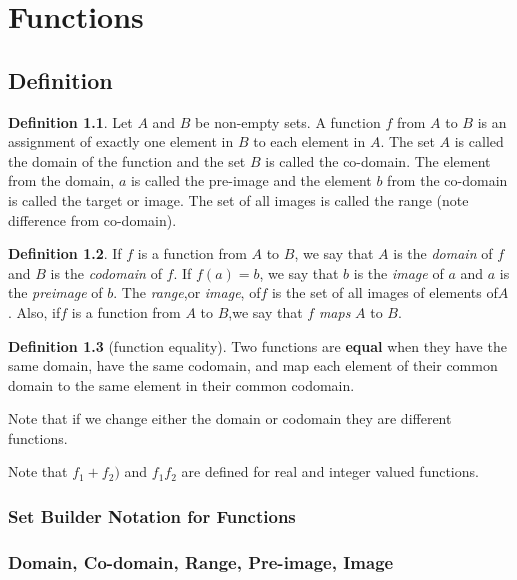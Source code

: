 \documentclass[11pt]{book} %
\theoremstyle {definition}
\newtheorem {definition}{Definition}[section]
\theoremstyle {remark}
\begin{document}
\newpage






\chapter {Functions}

\section {Definition}

\begin {definition}
Let $A$ and $B$ be non-empty sets. A function $f$ from $A$ to $B$ is an assignment of exactly one element in $B$ to each element in $A$. The set $A$ is called the domain of the function and the set $B$ is called the co-domain. The element from the domain, $a$ is called the pre-image and the element $b$ from the co-domain is called the target or image. The set of all images is called the range (note difference from co-domain).
\end {definition} 

\begin {definition}
If $f$ is a function from $A$ to $B$, we say that $A$ is the \textit{domain} of $f$ and $B$ is the \textit{codomain} of $f$. If $f(a)=b$, we say that $b$ is the \textit{image} of $a$ and $a$ is the \textit{preimage} of $b$. The \textit{range},or \textit{image}, of$f$ is the set of all images of elements of$A$. Also, if$f$ is a function from $A$ to $B$,we say that $f$ \textit{maps} $A$ to $B$. 
\end {definition}

\begin {definition}[function equality]
Two functions are \textbf{equal} when they have the same domain, have the same codomain, and map each element of their common domain to the same element in their common codomain.
\end {definition}
Note that if we change either the domain or codomain they are different functions.

Note that $f_1 + f_2)$ and $f_1 f_2$ are defined for real and integer valued functions.

\subsection {Set Builder Notation for Functions}

\subsection {Domain, Co-domain, Range, Pre-image, Image}
\end{document}
